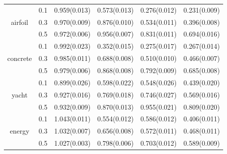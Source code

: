 \begin{table}[h]
{{\begin{tabular}{|c|c|c|c|c|c|}
\multirow{3}{*}{airfoil}
 & 0.1 & 0.959(0.013) & 0.573(0.013) & 0.276(0.012) & \cellcolor{gray!50}0.231(0.009) \\
 & 0.3 & 0.970(0.009) & 0.876(0.010) & 0.534(0.011) & \cellcolor{gray!50}0.396(0.008) \\
 & 0.5 & 0.972(0.006) & 0.956(0.007) & 0.831(0.011) & \cellcolor{gray!50}0.694(0.016) \\
\hline

\multirow{3}{*}{concrete}
 & 0.1 & 0.992(0.023) & 0.352(0.015) & 0.275(0.017) & \cellcolor{gray!50}0.267(0.014) \\
 & 0.3 & 0.985(0.011) & 0.688(0.008) & 0.510(0.010) & \cellcolor{gray!50}0.466(0.007) \\
 & 0.5 & 0.979(0.006) & 0.868(0.008) & 0.792(0.009) & \cellcolor{gray!50}0.685(0.008) \\
\hline

\multirow{3}{*}{yacht}
 & 0.1 & 0.899(0.026) & 0.598(0.022) & 0.548(0.026) & \cellcolor{gray!50}0.439(0.020) \\
 & 0.3 & 0.927(0.016) & 0.769(0.018) & 0.746(0.027) & \cellcolor{gray!50}0.569(0.016) \\
 & 0.5 & 0.932(0.009) & 0.870(0.013) & 0.955(0.021) & \cellcolor{gray!50}0.809(0.020) \\
\hline

\multirow{3}{*}{energy}
 & 0.1 & 1.043(0.011) & 0.554(0.012) & 0.586(0.012) & \cellcolor{gray!50}0.406(0.011) \\
 & 0.3 & 1.032(0.007) & 0.656(0.008) & 0.572(0.011) & \cellcolor{gray!50}0.468(0.011) \\
 & 0.5 & 1.027(0.003) & 0.798(0.006) & 0.703(0.012) & \cellcolor{gray!50}0.589(0.009) \\
\hline

\end{tabular}%
}
} %
\end{table}



